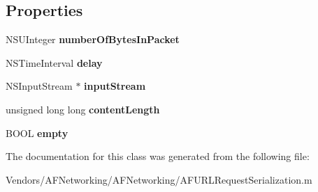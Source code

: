 \subsection*{Properties}
\begin{DoxyCompactItemize}
\item 
\hypertarget{interface_a_f_multipart_body_stream_a4f5df6b4fa6024d8bbedf72f2bef974d}{}N\+S\+U\+Integer {\bfseries number\+Of\+Bytes\+In\+Packet}\label{interface_a_f_multipart_body_stream_a4f5df6b4fa6024d8bbedf72f2bef974d}

\item 
\hypertarget{interface_a_f_multipart_body_stream_aabbac8502bef80a07707380ebadb2791}{}N\+S\+Time\+Interval {\bfseries delay}\label{interface_a_f_multipart_body_stream_aabbac8502bef80a07707380ebadb2791}

\item 
\hypertarget{interface_a_f_multipart_body_stream_a4df6d43d9551415f2a633d7de248508e}{}N\+S\+Input\+Stream $\ast$ {\bfseries input\+Stream}\label{interface_a_f_multipart_body_stream_a4df6d43d9551415f2a633d7de248508e}

\item 
\hypertarget{interface_a_f_multipart_body_stream_aaee3ebc73e6cade317c7524089880b3d}{}unsigned long long {\bfseries content\+Length}\label{interface_a_f_multipart_body_stream_aaee3ebc73e6cade317c7524089880b3d}

\item 
\hypertarget{interface_a_f_multipart_body_stream_ae9b2a8f4b9b328d29f0b7c64410577c9}{}B\+O\+O\+L {\bfseries empty}\label{interface_a_f_multipart_body_stream_ae9b2a8f4b9b328d29f0b7c64410577c9}

\end{DoxyCompactItemize}


The documentation for this class was generated from the following file\+:\begin{DoxyCompactItemize}
\item 
Vendors/\+A\+F\+Networking/\+A\+F\+Networking/A\+F\+U\+R\+L\+Request\+Serialization.\+m\end{DoxyCompactItemize}
